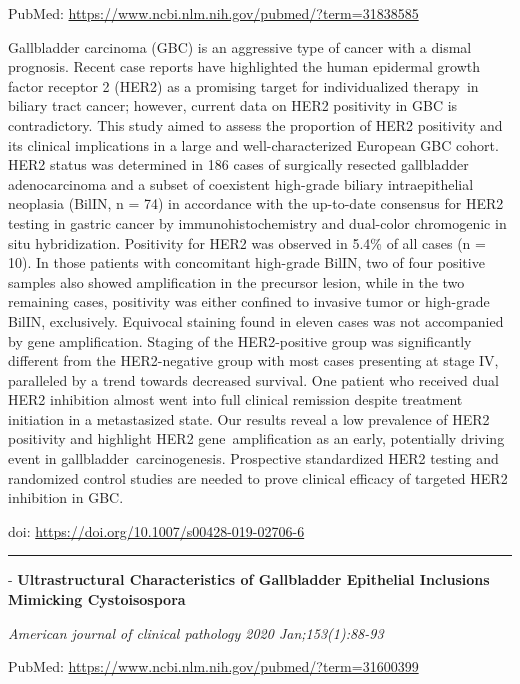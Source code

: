 \documentclass[
]{article}
\renewcommand{\linethickness}{0.05em}
\begin{document}
PubMed: \url{https://www.ncbi.nlm.nih.gov/pubmed/?term=31838585}

Gallbladder carcinoma (GBC) is an aggressive type of cancer with a
dismal prognosis. Recent case reports have highlighted the human
epidermal growth factor receptor 2 (HER2) as a promising target for
individualized therapy~in biliary tract cancer; however, current data on
HER2 positivity in GBC is contradictory. This study aimed to assess the
proportion of HER2 positivity and its clinical implications in a large
and well-characterized European GBC cohort. HER2 status was determined
in 186 cases of surgically resected gallbladder adenocarcinoma and a
subset of coexistent high-grade biliary intraepithelial neoplasia
(BilIN, n = 74) in accordance with the up-to-date consensus for HER2
testing in gastric cancer by immunohistochemistry and dual-color
chromogenic in situ hybridization. Positivity for HER2 was observed in
5.4\% of all cases (n = 10). In those patients with concomitant
high-grade BilIN, two of four positive samples also showed amplification
in the precursor lesion, while in the two remaining cases, positivity
was either confined to invasive tumor or high-grade BilIN, exclusively.
Equivocal staining found in eleven cases was not accompanied by gene
amplification. Staging of the HER2-positive group was significantly
different from the HER2-negative group with most cases presenting at
stage IV, paralleled by a trend towards decreased survival. One patient
who received dual HER2 inhibition almost went into full clinical
remission despite treatment initiation in a metastasized state. Our
results reveal a low prevalence of HER2 positivity and highlight HER2
gene~amplification as an early, potentially driving event in
gallbladder~carcinogenesis. Prospective standardized HER2 testing and
randomized control studies are needed to prove clinical efficacy of
targeted HER2 inhibition in GBC.

doi: \url{https://doi.org/10.1007/s00428-019-02706-6}

\begin{center}\rule{0.5\linewidth}{\linethickness}\end{center}

- \textbf{Ultrastructural Characteristics of Gallbladder Epithelial
Inclusions Mimicking Cystoisospora}

\emph{American journal of clinical pathology 2020 Jan;153(1):88-93}

PubMed: \url{https://www.ncbi.nlm.nih.gov/pubmed/?term=31600399}
\end{document}
